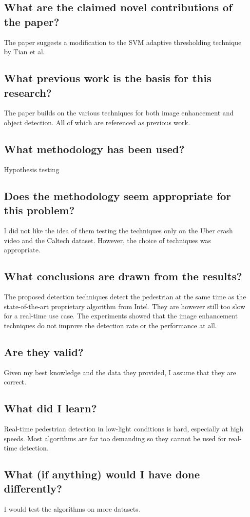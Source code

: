 \documentclass[11pt,a4paper]{article}
\begin{document}
\subsection*{What are the claimed novel contributions of the paper?}
The paper suggests a modification to the SVM adaptive thresholding technique by Tian et al.
\subsection*{What previous work is the basis for this research?}
The paper builds on the various techniques for both image enhancement and object detection. All of which are referenced as previous work.
\subsection*{What methodology has been used?}
Hypothesis testing
\subsection*{Does the methodology seem appropriate for this problem?}
I did not like the idea of them testing the techniques only on the Uber crash video and the Caltech dataset. However, the choice of techniques was appropriate.
\subsection*{What conclusions are drawn from the results?}
The proposed detection techniques detect the pedestrian at the same time as the state-of-the-art proprietary algorithm from Intel. They are however still too slow for a real-time use case. The experiments showed that the image enhancement techniques do not improve the detection rate or the performance at all.
\subsection*{Are they valid?}
Given my best knowledge and the data they provided, I assume that they are correct.
\subsection*{What did I learn?}
Real-time pedestrian detection in low-light conditions is hard, especially at high speeds. Most algorithms are far too demanding so they cannot be used for real-time detection.
\subsection*{What (if anything) would I have done differently?}
I would test the algorithms on more datasets.

\newpage
\printbibliography
\end{document}
